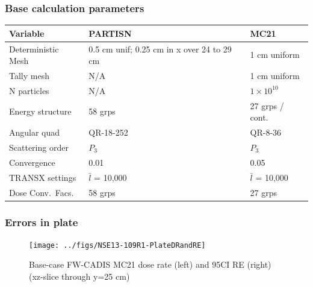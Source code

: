 \documentclass[xcolor=x11names,compress]{beamer}
\renewcommand{\(}{\begin{columns}}
\renewcommand{\)}{\end{columns}}
\newcommand{\<}[1]{\begin{column}{#1}}
\renewcommand{\>}{\end{column}}
\begin{document}
\begin{frame}[fragile]
  \frametitle{Base calculation parameters}
  \begin{table}[p]
  \label{tab:calcParams}
  \begin{center}
    \begin{tabu}{| X | X | X |}\hline
      Variable & PARTISN & MC21\\\hline\hline
	Deterministic Mesh & 0.5 cm unif; 0.25 cm in x over 24 to 29 cm & 1 cm uniform \\\hline
	Tally mesh & N/A & 1 cm uniform \\\hline
	N particles & N/A & $1 \times 10^{10}$\\\hline
	Energy structure & 58 grps & 27 grps / cont.\\\hline
	Angular quad & QR-18-252 & QR-8-36\\\hline
	Scattering order & $P_3$ & $P_3$\\\hline
	Convergence & 0.01 & 0.05\\\hline
	TRANSX settings & $\bar{l}$ = 10,000 & $\bar{l}$ = 10,000\\\hline
	Dose Conv.\ Facs. & 58 grps & 27 grps \\\hline
    \end{tabu}
  \end{center}
\end{table}
  
\end{frame}


\begin{frame}[fragile]
  \frametitle{Errors in plate}
 \begin{figure}[p]
   \begin{center}
     \texttt{[image: ../figs/NSE13-109R1-PlateDRandRE]}
   \end{center}
   \caption{Base-case FW-CADIS MC21 dose rate (left) and 95CI RE (right) (xz-slice through y=25 cm)}
   \label{fig:Plate}
 \end{figure}
\end{frame}


\end{document}
